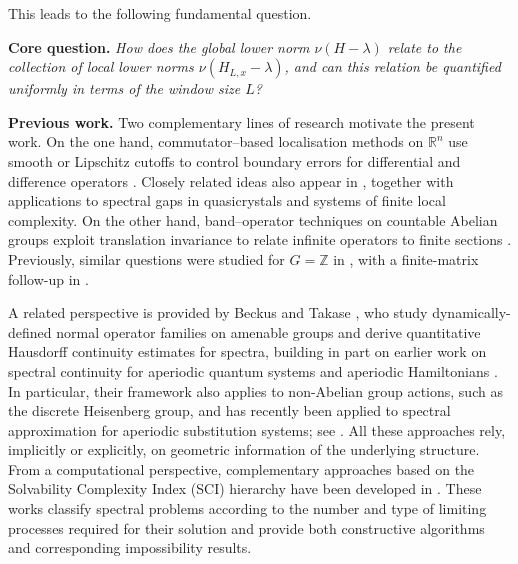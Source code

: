 \documentclass[11pt]{article}
\theoremstyle{definition}
\newcommand{\R}{\mathbb{R}}
\begin{document}
This leads to the following fundamental question.

\medskip
\noindent\textbf{Core question.}
\emph{How does the global lower norm $\nu(H-\lambda)$ relate to the collection of
local lower norms $\nu(H_{L,x}-\lambda)$, and can this relation be quantified
uniformly in terms of the window size $L$?}

\medskip

\noindent\textbf{Previous work.}
Two complementary lines of research motivate the present work.
On the one hand, commutator--based localisation methods on $\R^n$ use smooth or
Lipschitz cutoffs to control boundary errors for differential and difference
operators \cite{HegeMoscolariTeufel2026}. Closely related ideas also appear in \cite{Hege2024Thesis,HegeMoscolariTeufel2022}, together with applications to
spectral gaps in quasicrystals and systems of finite local complexity.
On the other hand, band--operator techniques on countable Abelian groups exploit
translation invariance to relate infinite operators to finite sections \cite{LindnerSeifertChandlerWildePreprint}. Previously, similar questions were studied
for $G=\mathbb{Z}$ in
\cite{ChandlerWildeChonchaiyaLindner2023,ChandlerWildeChonchaiyaLindner2024}, with a finite-matrix follow-up in \cite{ChandlerWildeLindner2025}.

A related perspective is provided by Beckus and Takase \cite{BeckusTakase2025},
who study dynamically-defined normal operator families on amenable groups and
derive quantitative Hausdorff continuity estimates for spectra, building in part on
earlier work on spectral continuity for aperiodic quantum systems and aperiodic
Hamiltonians \cite{BeckusBellissardDeNittis2018,BeckusBellissardCornean2019}. In particular,
their framework also applies to non-Abelian group actions, such as the discrete
Heisenberg group, and has recently been applied to spectral approximation for
aperiodic substitution systems; see \cite{BandBeckusPogorzelskiTenenbaum2025}.
All these approaches rely, implicitly or explicitly, on geometric information of the underlying structure. 
From a computational perspective, complementary approaches based on the
Solvability Complexity Index (SCI) hierarchy have been developed in
\cite{Hansen2011,BenArtziColbrookHansenNevanlinnaSeidel2020,
ColbrookHansen2023, ColbrookEmbreeFillman2026}. These works classify spectral problems according to
the number and type of limiting processes required for their solution and
provide both constructive algorithms and corresponding impossibility
results.
\end{document}
